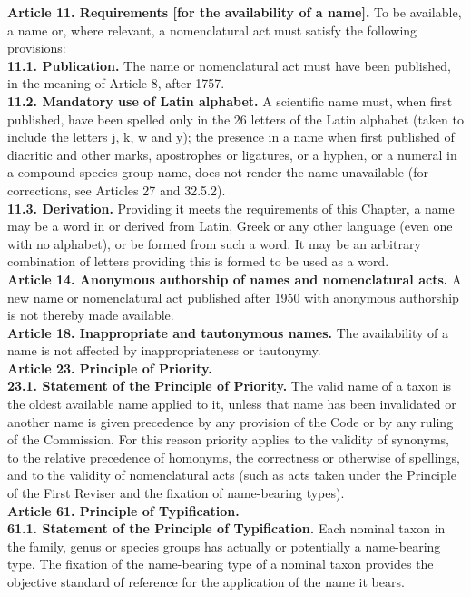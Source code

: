 \documentclass[letterpaper, 11pt]{article}
\begin{document}
\noindent{}\textbf{Article 11. Requirements [for the availability of a name].} To be available, a name or, where relevant, a nomenclatural act must satisfy the following provisions:\\
\noindent{}\textbf{11.1. Publication.} The name or nomenclatural act must have been published, in the meaning of Article 8, after 1757.\\
\noindent{}\textbf{11.2. Mandatory use of Latin alphabet.} A scientific name must, when first published, have been spelled only in the 26 letters of the Latin alphabet (taken to include the letters j, k, w and y); the presence in a name when first published of diacritic and other marks, apostrophes or ligatures, or a hyphen, or a numeral in a compound species-group name, does not render the name unavailable (for corrections, see Articles 27 and 32.5.2).\\
\noindent{}\textbf{11.3. Derivation.} Providing it meets the requirements of this Chapter, a name may be a word in or derived from Latin, Greek or any other language (even one with no alphabet), or be formed from such a word. It may be an arbitrary combination of letters providing this is formed to be used as a word.\\

\noindent{}\textbf{Article 14. Anonymous authorship of names and nomenclatural acts.} A new name or nomenclatural act published after 1950 with anonymous authorship is not thereby made available.\\

\noindent{}\textbf{Article 18. Inappropriate and tautonymous names.} The availability of a name is not affected by inappropriateness or tautonymy.\\

\noindent{}\textbf{Article 23. Principle of Priority.}\\
\noindent{}\textbf{23.1. Statement of the Principle of Priority.} The valid name of a taxon is the oldest available name applied to it, unless that name has been invalidated or another name is given precedence by any provision of the Code or by any ruling of the Commission. For this reason priority applies to the validity of synonyms, to the relative precedence of homonyms, the correctness or otherwise of spellings, and to the validity of nomenclatural acts (such as acts taken under the Principle of the First Reviser and the fixation of name-bearing types).\\

\noindent{}\textbf{Article 61. Principle of Typification.}\\
\noindent{}\textbf{61.1. Statement of the Principle of Typification.} Each nominal taxon in the family, genus or species groups has actually or potentially a name-bearing type. The fixation of the name-bearing type of a nominal taxon provides the objective standard of reference for the application of the name it bears.
\end{document}

